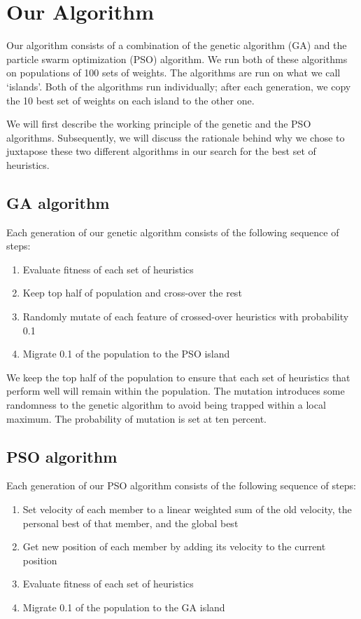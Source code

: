 \documentclass{article}
\begin{document}
\section{Our Algorithm}

Our algorithm consists of a combination of the genetic algorithm (GA) and the
particle swarm optimization (PSO) algorithm. We run both of these algorithms on
populations of 100 sets of weights. The algorithms are run on what we call
‘islands’. Both of the algorithms run individually; after each generation, we
copy the 10 best set of weights on each island to the other one.

We will first describe the working principle of the genetic and the PSO
algorithms. Subsequently, we will discuss the rationale behind why we chose to
juxtapose these two different algorithms in our search for the best set of
heuristics.

\subsection{GA algorithm}
Each generation of our genetic algorithm consists of the following sequence of steps:
\begin{enumerate}
	\item Evaluate fitness of each set of heuristics
	\item Keep top half of population and cross-over the rest
	\item Randomly mutate of each feature of crossed-over heuristics with probability 0.1
	\item Migrate 0.1 of the population to the PSO island
\end{enumerate}
We keep the top half of the population to ensure that each set of heuristics
that perform well will remain within the population. The mutation introduces
some randomness to the genetic algorithm to avoid being trapped within a local
maximum. The probability of mutation is set at ten percent.

\subsection{PSO algorithm}
Each generation of our PSO algorithm consists of the following sequence of steps:
\begin{enumerate}
	\item Set velocity of each member to a linear weighted sum of the old
		velocity, the personal best of that member, and the global best
	\item Get new position of each member by adding its velocity to the current
		position
	\item Evaluate fitness of each set of heuristics
	\item Migrate 0.1 of the population to the GA island
\end{enumerate}
\end{document}
